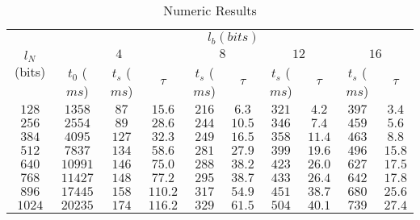 \documentclass[english,draftcls,onecolumn,11pt]{IEEEtran}
\providecommand{\tabularnewline}{\\}
\theoremstyle{definition}
\theoremstyle{plain}
\theoremstyle{plain}
\theoremstyle{definition}
\begin{document}
\begin{table*}
\caption{Numeric Results\label{tab:Numeric-Results}}


\centering{}\begin{tabular}{|c|c|c|c|c|c|c|c|c|c|}
\hline 
\multirow{3}{*}{$l_{N}$(bits)} & \multicolumn{9}{c|}{$l_{b}(bits)$}\tabularnewline
\cline{2-10} 
 & \multicolumn{3}{c|}{$4$} & \multicolumn{2}{c|}{$8$} & \multicolumn{2}{c|}{$12$} & \multicolumn{2}{c|}{$16$}\tabularnewline
\cline{2-10} 
 & $t_{0}$ ($ms$) & $t_{s}$ ($ms$) & $\tau$ & $t_{s}$ ($ms$) & $\tau$ & $t_{s}$ ($ms$) & $\tau$ & $t_{s}$ ($ms$) & $\tau$\tabularnewline
\hline 
$128$ & $1358$ & $87$ & $15.6$ & $216$ & $6.3$ & $321$ & $4.2$ & $397$ & $3.4$\tabularnewline
\hline 
$256$ & $2554$ & $89$ & $28.6$ & $244$ & $10.5$ & $346$ & $7.4$ & $459$ & $5.6$\tabularnewline
\hline 
$384$ & $4095$ & $127$ & $32.3$ & $249$ & $16.5$ & $358$ & $11.4$ & $463$ & $8.8$\tabularnewline
\hline 
$512$ & $7837$ & $134$ & $58.6$ & $281$ & $27.9$ & $399$ & $19.6$ & $496$ & $15.8$\tabularnewline
\hline 
$640$ & $10991$ & $146$ & $75.0$ & $288$ & $38.2$ & $423$ & $26.0$ & $627$ & $17.5$\tabularnewline
\hline 
$768$ & $11427$ & $148$ & $77.2$ & $295$ & $38.7$ & $433$ & $26.4$ & $642$ & $17.8$\tabularnewline
\hline 
$896$ & $17445$ & $158$ & $110.2$ & $317$ & $54.9$ & $451$ & $38.7$ & $680$ & $25.6$\tabularnewline
\hline 
$1024$ & $20235$ & $174$ & $116.2$ & $329$ & $61.5$ & $504$ & $40.1$ & $739$ & $27.4$\tabularnewline
\hline 
\end{tabular}
\end{table*}
\end{document}
